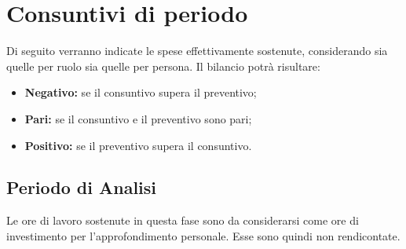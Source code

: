 \section{Consuntivi di periodo}
Di seguito verranno indicate le spese effettivamente sostenute, considerando sia quelle per ruolo sia quelle per persona. Il bilancio potrà risultare:
\begin{itemize}
	\item \textbf{Negativo:} se il consuntivo supera il preventivo;
	\item \textbf{Pari:} se il consuntivo e il preventivo sono pari;
	\item \textbf{Positivo:} se il preventivo supera il consuntivo.
\end{itemize}

\subsection{Periodo di Analisi}
Le ore di lavoro sostenute in questa fase sono da considerarsi come ore di investimento per l'approfondimento personale. Esse sono quindi non rendicontate.

